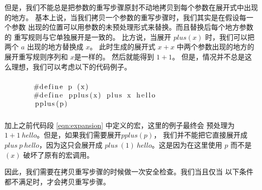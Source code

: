 
但是，我们不能总是把参数的重写步骤原封不动地拷贝到每个参数在展开式中出现的地方。
基本上说，当我们拷贝一个参数的重写步骤时，我们其实是在假设每一个参数
出现的位置可以用参数的未预处理形式来替换。而且替换后每个地方参数的
重写规则与它单独展开是一致的。
比方说，当展开 $plus(x)$ 时，我们可以把两个 $a$ 出现的地方替换成 $x$。
此时生成的展开式 $x+x$ 中两个参数出现的地方的展开重写规则序列和 $x$是一样的。
然后就能得到 $1+1$。
但是，情况并不总是这么理想，我们可以考虑以下的代码例子。

\begin{equation}\label{eqn:expandToParentheses}
  \begin{minipage}{0.8\columnwidth}
\begin{lstlisting}
#define p (x)
#define pplus(x) plus x hello
pplus(p)  
\end{lstlisting}
    \end{minipage}
\end{equation}

加上之前代码段 \ref{eqn:expansion} 中定义的宏，这里的例子最终会
预处理为$1+1\ hello$。但是，如果我们需要展开$pplus(p)$，
我们并不能把它直接展开成$plus\ p\ hello$，因为这只会展开成
$plus\ (1)\ hello$。这是因为在这里使用 $p$ 而不是 $(x)$ 
破坏了原有的宏调用。


因此，我们需要在拷贝重写步骤的时候做一次安全检查。我们当且仅当
以下条件都不满足时，才会拷贝重写步骤。

